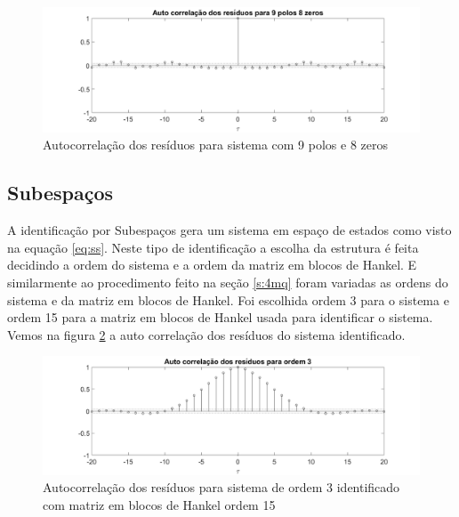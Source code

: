 \begin{figure}[H]
	\centering
	\includegraphics[width=1.1\linewidth]{autocorrelacao98}
	\caption[Autocorrelação dos resíduos para sistema com 9 polos e 8 zeros]{Autocorrelação dos resíduos para sistema com 9 polos e 8 zeros}
	\label{fig:autocorrelacao98}
\end{figure}

\subsection{Subespaços}\label{s:4subespacos}
A identificação por Subespaços gera um sistema em espaço de estados como visto na equação \ref{eq:ss}. Neste tipo de identificação a escolha da estrutura é feita decidindo a ordem do sistema e a ordem da matriz em blocos de Hankel. E similarmente ao procedimento feito na seção \ref{s:4mq} foram variadas as ordens do sistema e da matriz em blocos de Hankel.
Foi escolhida ordem 3 para o sistema e ordem 15 para a matriz em blocos de Hankel usada para identificar o sistema. Vemos na figura \ref{fig:autocorrelacao315} a auto correlação dos resíduos do sistema identificado.

\begin{figure}[H]
	\centering
	\includegraphics[width=1.1\linewidth]{autocorrelacao315}
	\caption[Autocorrelação dos resíduos para sistema de ordem 3]{Autocorrelação dos resíduos para sistema de ordem 3 identificado com matriz em blocos de Hankel ordem 15}
	\label{fig:autocorrelacao315}
\end{figure}


